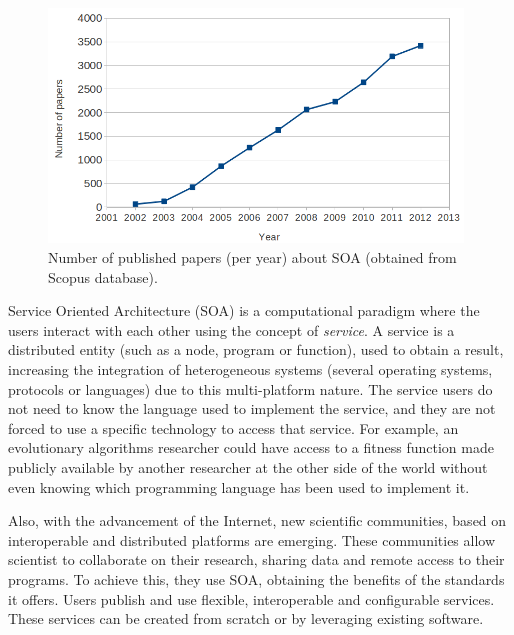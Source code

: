 

\begin{figure}
\centering
\includegraphics[width=26pc]{gfx/soa/papersYear.png}
\caption{Number of published papers (per year) about SOA (obtained from Scopus database).}
\label{fig:soapapers}
\end{figure}


Service Oriented Architecture (SOA) is a computational
paradigm where the users %
interact with each other using the concept of
{\em service}. A service is a distributed entity (such as a node, program or
function), used to obtain a result, increasing the integration of heterogeneous
systems (several operating systems, protocols or languages) due to
this multi-platform nature. The service users do not need to know
the language used to implement the service, and they are not
forced to use a specific technology to access that service. For
example, an evolutionary algorithms researcher could have access to a
fitness function made publicly available by another researcher at the
other side of the world without even knowing which programming language
has been used to implement it. %

Also, with the advancement of the Internet, new scientific
communities, based on interoperable and distributed platforms are
emerging. These communities allow scientist to collaborate on their
research, sharing data and remote access to their programs. To achieve
this, they use SOA, obtaining the benefits of the standards it
offers. Users publish and use flexible, interoperable and configurable
services. These services can be created from scratch or by leveraging
existing software. %

